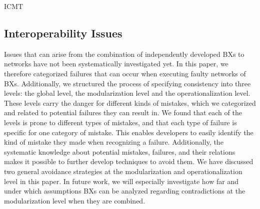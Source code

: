 \begin{copiedFrom}{ICMT}

\subsection{Interoperability Issues}
Issues that can arise from the combination of independently developed \acp{BX} to networks have not been systematically investigated yet.
In this paper, we therefore categorized failures that can occur when executing faulty networks of \acp{BX}.
Additionally, we structured the process of specifying consistency into three levels: the global level, the modularization level and the operationalization level.
These levels carry the danger for different kinds of mistakes, which we categorized and related to potential failures they can result in.
We found that each of the levels is prone to different types of mistakes, and that each type of failure is specific for one category of mistake.
This enables developers to easily identify the kind of mistake they made when recognizing a failure.
Additionally, the systematic knowledge about potential mistakes, failures, and their relations makes it possible to further develop techniques to avoid them.
We have discussed two general avoidance strategies at the modularization and operationalization level in this paper.
In future work, we will especially investigate how far and under which assumptions \acp{BX} can be analyzed regarding contradictions at the modularization level when they are combined.

\end{copiedFrom} %



